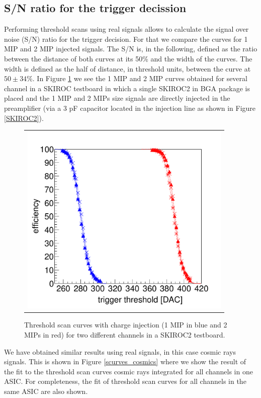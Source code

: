 \documentclass[a4paper,11pt]{article}
\begin{document}
\subsection{S/N ratio for the trigger decission}
\label{sec:comm_trigger_sn}

Performing threshold scans using
real signals allows to calculate the signal over noise (S/N) ratio
for the trigger decision.
For that we compare the curves for 1 MIP and 2 MIP injected signals.
The S/N is, in the following, defined as the ratio between the distance of both curves at its
50\% and the width of the curves. The width is defined as the half of distance, in threshold units, between the
curve at $50\pm34\%$.
In Figure \ref{scurves_injection} we see the 1 MIP and 2 MIP curves obtained for several channel
in a SKIROC testboard in which a single SKIROC2 in BGA package is placed and the 1 MIP and 2 MIPs 
size signals are directly injected in the preamplifier 
(via a 3 pF capacitor located in the injection line as shown in Figure \ref{SKIROC2}). 


\begin{figure}[!t]
    \centering
  \begin{tabular}{l}
    \includegraphics[width=4in]{scurve_pp_fastshaper_ch_DAC-eps-converted-to.pdf} \\
	\end{tabular}
\caption{Threshold scan curves with charge injection (1 MIP in blue and 2 MIPs in red) for two different channels in a SKIROC2 testboard.}
\label{scurves_injection}
\end{figure}


We have obtained similar results using real signals, in this case cosmic rays signals. This is shown 
in Figure \ref{scurves_cosmics}  where 
we show the result of the fit to the threshold scan curves cosmic rays integrated for all channels
in one ASIC. For completeness, the fit of threshold scan curves for all channels
in the same ASIC are also shown.
\end{document}
